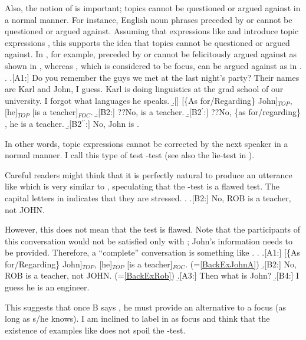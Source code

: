 Also, the notion of  is important;
topics cannot be questioned or argued against in a normal manner.
For instance,
English noun phrases preceded by  or  cannot be questioned or argued against.
Assuming that expressions like  and  introduce topic expressions \cite{kuno72,kuno76,gundel74},
this supports the idea that topics cannot be questioned or argued against.
In \Next, for example,
 preceded by  or  cannot be felicitously argued against as shown in \Next[B2,B2$^{\prime}$],
whereas , which is considered to be focus,
can be argued against as in .
%
\ex. \a.[A1:] Do you remember the guys we met at the last night's party?\label{BackExJohnA}
     Their names are Karl and John, I guess.
     Karl is doing linguistics at the grad school of our university.
     I forgot what languages he speaks.
     \b.[] [\{As for/Regarding\} John]$_{TOP}$, [he]$_{TOP}$ [is a teacher]$_{FOC}$.
     \b.[B2:] ??No,  is a teacher.
     \b.[B2$^{\prime}$:] ??No, \{as for/regarding\} , he is a teacher.
     \b.[B2$^{\prime\prime}$:] No, John is .

In other words, topic expressions cannot be corrected by the next speaker in a normal manner.
I call this type of test -test
 (see also the lie-test in ).

Careful readers might think that it is perfectly natural to produce an utterance like \Next which is very similar to \Last[B2],
speculating that the -test is a flawed test.
The capital letters in \Next indicates that
they are stressed.
%
\ex. \a.[B2:]\label{BackExRob} No, {ROB} is a teacher, not JOHN.

However, this does not mean that the test is flawed.
Note that the participants of this conversation would not be satisfied only with \Last;
John's information needs to be provided.
Therefore, a ``complete'' conversation is something like \Next.
%
\ex. \a.[A1:] [\{As for/Regarding\} John]$_{TOP}$, [he]$_{TOP}$ [is a teacher]$_{FOC}$. \hfill{(=\ref{BackExJohnA})}
     \b.[B2:] No, {ROB} is a teacher, not JOHN. \hfill{(=\ref{BackExRob})}
     \b.[A3:] Then what is John?
     \b.[B4:] I guess he is an engineer.

This suggests that
once B says , he must provide an alternative to a focus (as long as s/he knows).
I am inclined to label  in \Last[B2] as focus
and think that the existence of examples like \LLast[B] does not spoil the -test.


